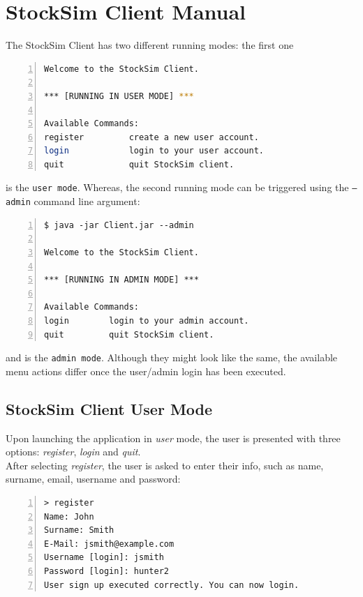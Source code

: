 \chapter{StockSim Client Manual}
The StockSim Client has two different running modes: the first one
\begin{lstlisting}[basicstyle=\footnotesize\ttfamily,language=bash,numbers=left,
numberstyle=\footnotesize,numbersep=8pt,frame=single]
Welcome to the StockSim Client.

*** [RUNNING IN USER MODE] ***

Available Commands:
register         create a new user account.              
login            login to your user account.             
quit             quit StockSim client. 
\end{lstlisting}
is the \texttt{user mode}. Whereas, the second running mode can be triggered 
using the \texttt{--admin} command line argument:
\begin{lstlisting}[basicstyle=\footnotesize\ttfamily,language={},numbers=left,
numberstyle=\footnotesize,numbersep=8pt,frame=single]
$ java -jar Client.jar --admin

Welcome to the StockSim Client.

*** [RUNNING IN ADMIN MODE] ***

Available Commands:
login        login to your admin account.            
quit         quit StockSim client.
\end{lstlisting}
and is the \texttt{admin mode}. Although they might look like the same, the 
available menu actions differ once the user/admin login has been executed.

\section{StockSim Client User Mode}
Upon launching the application in \textit{user} mode, the user is presented with three options: \textit{register}, \textit{login} and \textit{quit}.\\
After selecting \textit{register}, the user is asked to enter their info, such as name, surname, email, username and password:
\begin{lstlisting}[basicstyle=\footnotesize\ttfamily,language={},numbers=left,
numberstyle=\footnotesize,numbersep=8pt,frame=single]
> register
Name: John
Surname: Smith
E-Mail: jsmith@example.com
Username [login]: jsmith
Password [login]: hunter2
User sign up executed correctly. You can now login.
\end{lstlisting}

